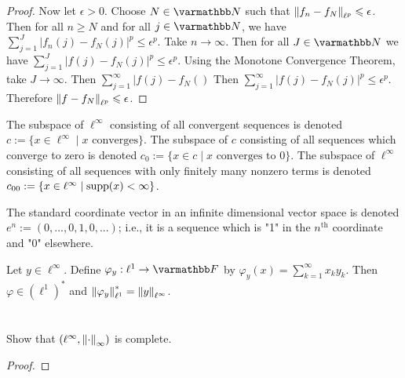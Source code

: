\begin{proof}
        Now let $\epsilon > 0$. Choose $N \in \bfN$ such that $\left\lVert f_n - f_N \right\rVert_{\ell^p} \leqslant \epsilon$. Then for all $n \geq N$ and for all $j \in \bfN$, we have $\sum_{j = 1}^J |f_n(j) - f_N(j)|^p \leq \epsilon^p$. Take $n \rightarrow \infty$. Then for all $J \in \bfN$ we have $\sum_{j = 1}^J |f(j) - f_N(j)|^p \leq \epsilon^p$. Using the Monotone Convergence Theorem, take $J \rightarrow \infty$. Then $\sum_{j = 1}^\infty |f(j) - f_N()$ Then $\sum_{j = 1}^\infty |f(j) - f_N(j)|^p \leq \epsilon^p$. Therefore $\left\lVert f - f_N \right\rVert_{\ell^p} \leqslant \epsilon$.
    \end{proof}

\begin{definition}
    The subspace of $\ell^\infty$ consisting of all convergent sequences is denoted $c := \{x \in \ell^\infty \mid x \text{ converges}\}$. The subspace of $c$ consisting of all sequences which converge to zero is denoted $c_0 := \{x \in c \mid x \text{ converges to 0}\}$. The subspace of $\ell^\infty$ consisting of all sequences with only finitely many nonzero terms is denoted $c_{00} := \{x \in \ell^\infty \mid \operatorname{supp}(x) < \infty\}$.
\end{definition}

\begin{definition}
    The standard coordinate vector in an infinite dimensional vector space is denoted $e^n := (0,...,0,1,0,...)$; i.e., it is a sequence which is "1" in the $n^\text{th}$ coordinate and "0" elsewhere.
\end{definition}

\begin{proposition}
    Let $y \in \ell^\infty$. Define $\varphi_y:\ell^1 \rightarrow \bfF$ by $\varphi_y(x) = \sum_{k = 1}^\infty x_k y_k$. Then $\varphi \in (\ell^1)^\ast$ and $\left\lVert \varphi_y \right\rVert_{\ell^1}^\ast = \left\lVert y \right\rVert_{\ell^\infty}$.
\end{proposition}





\section*{}

\begin{exercise}
Show that $(\ell^\infty,\left\lVert \cdot \right\rVert_\infty)$ is complete. 
\end{exercise}
    {\color{red} \begin{proof}
        
    \end{proof}}

